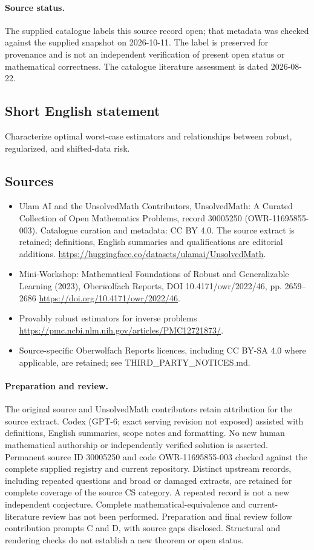 \documentclass[11pt]{article}
\begin{document}
\paragraph{Source status.}
The supplied catalogue labels this source record open; that metadata was checked against the supplied snapshot on 2026-10-11. The label is preserved for provenance and is not an independent verification of present open status or mathematical correctness. The catalogue literature assessment is dated 2026-08-22.
\subsection{Short English statement}
Characterize optimal worst-case estimators and relationships between robust, regularized, and shifted-data risk.
\subsection{Sources}
\begin{itemize}
\item[S1] Ulam AI and the UnsolvedMath Contributors, UnsolvedMath: A Curated Collection of Open Mathematics Problems, record 30005250 (OWR-11695855-003). Catalogue curation and metadata: CC BY 4.0. The source extract is retained; definitions, English summaries and qualifications are editorial additions.
\url{https://huggingface.co/datasets/ulamai/UnsolvedMath}.
\item[S2] Mini-Workshop: Mathematical Foundations of Robust and Generalizable Learning (2023), Oberwolfach Reports, DOI 10.4171/owr/2022/46, pp. 2659--2686
\url{https://doi.org/10.4171/owr/2022/46}.
\item[S3] Provably robust estimators for inverse problems
\url{https://pmc.ncbi.nlm.nih.gov/articles/PMC12721873/}.
\item Source-specific Oberwolfach Reports licences, including CC BY-SA 4.0 where applicable, are retained; see THIRD\_PARTY\_NOTICES.md.
\end{itemize}
\paragraph{Preparation and review.}
The original source and UnsolvedMath contributors retain attribution for the source extract. Codex (GPT-6; exact serving revision not exposed) assisted with definitions, English summaries, scope notes and formatting. No new human mathematical authorship or independently verified solution is asserted. Permanent source ID 30005250 and code OWR-11695855-003 checked against the complete supplied registry and current repository. Distinct upstream records, including repeated questions and broad or damaged extracts, are retained for complete coverage of the source CS category. A repeated record is not a new independent conjecture. Complete mathematical-equivalence and current-literature review has not been performed. Preparation and final review follow contribution prompts C and D, with source gaps disclosed. Structural and rendering checks do not establish a new theorem or open status.
\label{end:30005250}
\end{document}
